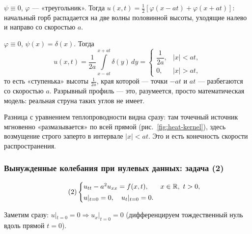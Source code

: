 \begin{example}
$\psi \equiv 0$, $\varphi$ — «треугольник». Тогда
$u(x,t) = \tfrac12[\varphi(x-at) + \varphi(x+at)]$: начальный горб распадается на
две волны половинной высоты, уходящие налево и направо со скоростью $a$.
\end{example}


\begin{example}
$\varphi \equiv 0$, $\psi(x) = \delta(x)$. Тогда
\[
  u(x,t) = \frac{1}{2a}\int\limits_{x-at}^{x+at} \delta(y)\, dy
  = \begin{cases}
      \dfrac{1}{2a}, & |x| < at, \\[6pt]
      0, & |x| > at,
    \end{cases}
\]
то есть «ступенька» высоты $\tfrac{1}{2a}$, края которой — точки $-at$ и $at$ —
разбегаются со скоростью $a$. Разрывный профиль — это, разумеется, просто
математическая модель: реальная струна таких углов не имеет.
\end{example}


\begin{idea}
Разница с уравнением теплопроводности видна сразу: там точечный источник мгновенно
«размазывается» по всей прямой (рис.~\ref{fig:heat-kernel}), здесь возмущение строго
заперто в интервале $|x| < at$. Это и есть конечность скорости распространения.
\end{idea}

\subsubsection*{Вынужденные колебания при нулевых данных: задача (2)}

\begin{equation}\tag{2}\label{eq:inf-forced}
  \begin{cases}
    u_{tt} - a^2 u_{xx} = f(x,t), & x \in \mathbb{R},\ t > 0, \\[2pt]
    u|_{t=0} = 0, \quad u_t|_{t=0} = 0 .
  \end{cases}
\end{equation}

Заметим сразу: $u|_{t=0} = 0 \Longrightarrow u_x|_{t=0} = 0$ (дифференцируем
тождественный нуль вдоль прямой $t=0$).

